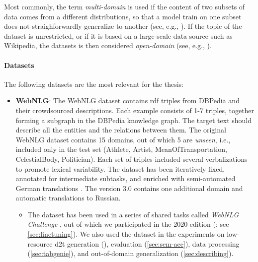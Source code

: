 {Most commonly, the term \emph{multi-domain} is used if the content of two subsets of data comes from a different distributions, so that a model train on one subset does not straighforwardly generalize to another (see, e.g., \citealp{vanderleeCACAPODatasetMultilingual2020,budzianowskiMultiWOZLargeScaleMultiDomain2020,rastogiScalableMultiDomainConversational2020}). If the topic of the dataset is unrestricted, or if it is based on a large-scale data source such as Wikipedia, the datasets is then considered \emph{open-domain} (see, e.g., \citealp{chenLogicalNaturalLanguage2020,nan2021dart,kann2022open}).

\paragraph{Datasets} The following datasets are the most relevant for the thesis:

\begin{itemize}
    \item \textbf{WebNLG}: The WebNLG dataset \cite{gardentCreatingTrainingCorpora2017,gardentWebNLGChallengeGenerating2017} contains \ac{rdf} triples from DBPedia \cite{auer2007dbpedia} and their crowdsourced descriptions. Each example consists of 1-7 triples, together forming a subgraph in the DBPedia knowledge graph. The target text should describe all the entities and the relations between them. The original WebNLG dataset \cite{gardentCreatingTrainingCorpora2017} contains 15 domains, out of which 5 are \emph{unseen}, i.e., included only in the test set (Athlete, Artist, MeanOfTransportation, CelestialBody, Politician). Each set of triples included several verbalizations to promote lexical variability. The dataset has been iteratively fixed, annotated for intermediate subtasks, and enriched with semi-automated German translations \cite{castroferreiraEnrichingWebNLGCorpus2018}. The version 3.0 \cite{ferreira20202020} contains one additional domain and automatic translations to Russian.
          \begin{itemize}
              \item
                    The dataset has been used in a series of shared tasks called \emph{WebNLG Challenge} \cite{gardentWebNLGChallengeGenerating2017,shimorinaWebNLGChallengeHuman2019,ferreira20202020,cripwell2023WebNLGShared2023}, out of which we participated in the 2020 edition (\citealp{ferreira20202020}; see \autoref{sec:finetuning}). We also used the dataset in the experiments on low-resource \ac{d2t} generation (), evaluation (\autoref{sec:sem-acc}), data processing (\autoref{sec:tabgenie}), and out-of-domain generalization (\autoref{sec:describing}).
          \end{itemize}


\end{itemize}}
